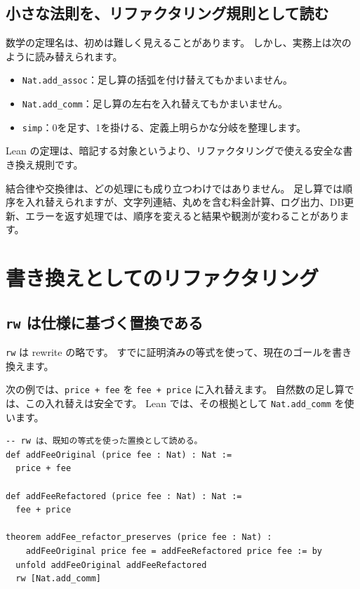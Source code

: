 \subsection{小さな法則を、リファクタリング規則として読む}

数学の定理名は、初めは難しく見えることがあります。
しかし、実務上は次のように読み替えられます。

\begin{itemize}
\item \texttt{Nat.add\_assoc}：足し算の括弧を付け替えてもかまいません。
\item \texttt{Nat.add\_comm}：足し算の左右を入れ替えてもかまいません。
\item \texttt{simp}：0を足す、1を掛ける、定義上明らかな分岐を整理します。
\end{itemize}

Lean の定理は、暗記する対象というより、リファクタリングで使える安全な書き換え規則です。

結合律や交換律は、どの処理にも成り立つわけではありません。
足し算では順序を入れ替えられますが、文字列連結、丸めを含む料金計算、ログ出力、DB更新、エラーを返す処理では、順序を変えると結果や観測が変わることがあります。

\section{書き換えとしてのリファクタリング}

\subsection{\texttt{rw} は仕様に基づく置換である}

\texttt{rw} は rewrite の略です。
すでに証明済みの等式を使って、現在のゴールを書き換えます。

次の例では、\texttt{price + fee} を \texttt{fee + price} に入れ替えます。
自然数の足し算では、この入れ替えは安全です。
Lean では、その根拠として \texttt{Nat.add\_comm} を使います。

\begin{listing}[htbp]
\begin{verbatim}
-- rw は、既知の等式を使った置換として読める。
def addFeeOriginal (price fee : Nat) : Nat :=
  price + fee

def addFeeRefactored (price fee : Nat) : Nat :=
  fee + price

theorem addFee_refactor_preserves (price fee : Nat) :
    addFeeOriginal price fee = addFeeRefactored price fee := by
  unfold addFeeOriginal addFeeRefactored
  rw [Nat.add_comm]
\end{verbatim}
\caption{\texttt{addFee\_refactor\_preserves}}
\label{lst:ch09_rw_comm}
\end{listing}

